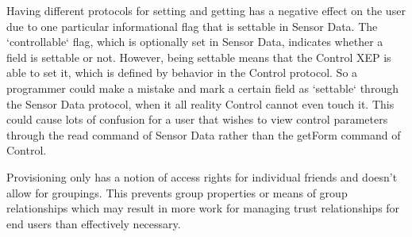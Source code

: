 Having different protocols for setting and getting has a negative effect on the
user due to one particular informational flag that is settable in Sensor Data.
The `controllable` flag, which is optionally set in Sensor Data, indicates
whether a field is settable or not. However, being settable means that the
Control XEP is able to set it, which is defined by behavior in the Control
protocol. So a programmer could make a mistake and mark a certain field as
`settable` through the Sensor Data protocol, when it all reality Control cannot
even touch it. This could cause lots of confusion for a user that wishes to view
control parameters through the read command of Sensor Data rather than the
getForm command of Control.

Provisioning only has a notion of access rights for individual friends and
doesn't allow for groupings. This prevents group properties or means of group
relationships which may result in more work for managing trust relationships for
end users than effectively necessary.
